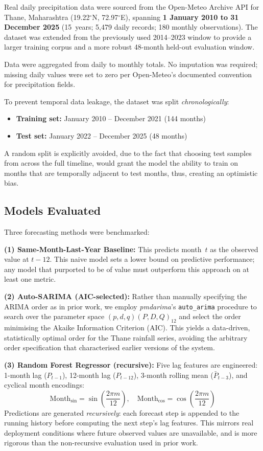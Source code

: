 \documentclass[conference]{IEEEtran}
\begin{document}
Real daily precipitation data were sourced from the Open-Meteo Archive
API for Thane, Maharashtra (19.22$^\circ$N,
72.97$^\circ$E), spanning \textbf{1 January 2010 to 31 December 2025}
(15~years; 5,479 daily records; 180 monthly observations). The dataset was
extended from the previously used 2014--2023 window to provide a larger
training corpus and a more robust 48-month held-out evaluation window.

Data were aggregated from daily to monthly totals. No imputation was
required; missing daily values were set to zero per Open-Meteo's documented
convention for precipitation fields.

To prevent temporal data leakage, the dataset was split
\textit{chronologically}:
\begin{itemize}
  \item \textbf{Training set:} January 2010 -- December 2021 (144 months)
  \item \textbf{Test set:} January 2022 -- December 2025 (48 months)
\end{itemize}
A random split is explicitly avoided, due to the fact that choosing test samples from across the full timeline, would grant the model the ability to train on months that are temporally adjacent to test months, thus, creating an optimistic bias.

\subsection{Models Evaluated}

Three forecasting methods were benchmarked:

\textbf{(1) Same-Month-Last-Year Baseline:} This predicts month~$t$ as the
observed value at $t-12$. This naive model sets a lower bound on
predictive performance; any model that purported to be of value must
outperform this approach on at least one metric.

\textbf{(2) Auto-SARIMA (AIC-selected):} Rather than manually specifying the
ARIMA order as in prior work, we employ \textit{pmdarima}'s \texttt{auto\_arima}
procedure to search over the parameter space
$(p, d, q)(P, D, Q)_{12}$ and select the order minimising the Akaike
Information Criterion (AIC). This yields a data-driven, statistically
optimal order for the Thane rainfall series, avoiding the arbitrary order
specification that characterised earlier versions of the system.

\textbf{(3) Random Forest Regressor (recursive):} Five lag features are
engineered: 1-month lag ($P_{t-1}$), 12-month lag ($P_{t-12}$), 3-month
rolling mean ($\bar{P}_{t-3}$), and cyclical month encodings:
\begin{equation}
  \text{Month}_{\sin} = \sin\!\left(\frac{2\pi m}{12}\right),\quad
  \text{Month}_{\cos} = \cos\!\left(\frac{2\pi m}{12}\right)
  \label{eq:cyclic}
\end{equation}
Predictions are generated \textit{recursively}: each forecast step is
appended to the running history before computing the next step's lag
features. This mirrors real deployment conditions where future observed
values are unavailable, and is more rigorous than the non-recursive
evaluation used in prior work.
\end{document}

